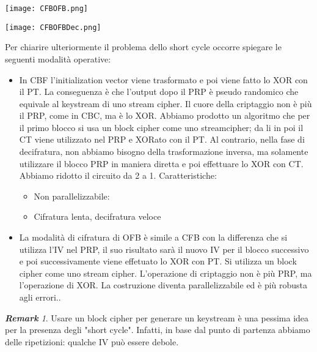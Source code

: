 \documentclass{article}
\theoremstyle{remark}
\newtheorem*{remark}{\textbf{Remark}}
\begin{document}
\begin{center}
    \texttt{[image: CFBOFB.png]}
\end{center}
\begin{center}
    \texttt{[image: CFBOFBDec.png]}
\end{center}
Per chiarire ulteriormente il problema dello short cycle occorre spiegare le seguenti modalità operative:
\begin{itemize}
    \item In CBF l'initialization vector viene trasformato e poi viene fatto lo XOR con il PT. La conseguenza è che l'output dopo il PRP è pseudo randomico che equivale al keystream di uno stream cipher. Il cuore della criptaggio non è più il PRP, come in CBC, ma è lo XOR. Abbiamo prodotto un algoritmo che per il primo blocco si usa un block cipher come uno streamcipher; da li in poi il CT viene utilizzato nel PRP e XORato con il PT. Al contrario, nella fase di decifratura, non abbiamo bisogno della trasformazione inversa, ma solamente utilizzare il blocco PRP in maniera diretta e poi effettuare lo XOR con CT. Abbiamo ridotto il circuito da 2 a 1. Caratteristiche:\begin{itemize}
        \item Non parallelizzabile:
        \item Cifratura lenta, decifratura veloce
    \end{itemize}
    \item La modalità di cifratura di OFB è simile a CFB con la differenza che si utilizza l'IV nel PRP, il suo risultato sarà il nuovo IV per il blocco successivo e poi successivamente viene effetuato lo XOR con PT. Si utilizza un block cipher come uno stream cipher. L'operazione di criptaggio non è più PRP, ma l'operazione di XOR. La costruzione diventa parallelizzabile ed è più robusta agli errori..
\end{itemize}
\begin{remark}
Usare un block cipher per generare un keystream è una pessima idea per la presenza degli "short cycle". Infatti, in base dal punto di partenza abbiamo delle ripetizioni: qualche IV può essere debole.
\end{remark}
\end{document}
